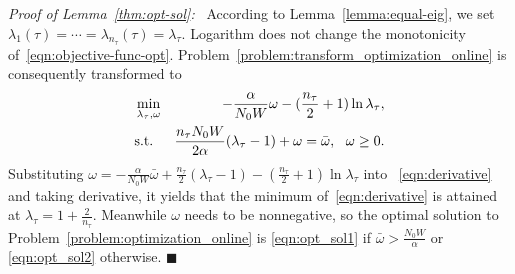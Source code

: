 \documentclass[twocolumn]{autart}    \usepackage{cite}
\begin{document}
{{\textit{Proof of Lemma~\ref{thm:opt-sol}:~}
According to Lemma~\ref{lemma:equal-eig}, we
set $\lambda_1(\tau)=\cdots=\lambda_{n_\tau}(\tau)=
\lambda_\tau$. Logarithm does not change the
monotonicity of~\eqref{eqn:objective-func-opt}.
Problem~\ref{problem:transform_optimization_online}
is consequently transformed to\vspace{-2mm}
\begin{eqnarray}
&\min\limits_{\lambda_\tau,\omega}&-\frac{\alpha}{N_0W}\omega
-(\frac{n_\tau}{2}+1)\ln{\lambda_\tau},\label{eqn:derivative}\\
&\hbox{s.t.}&\frac{n_\tau N_0W}{2\alpha}(\lambda_\tau-1)+\omega=\bar
\omega,~~ \omega\geq 0.\notag
\end{eqnarray}
Substituting $\omega=-\frac{\alpha}{N_0W}\bar \omega
+\frac{n_\tau}{2}(\lambda_\tau-1)-(\frac{n_\tau}{2}
+1)\ln{\lambda_\tau}$ into ~\eqref{eqn:derivative}
and taking derivative, it yields that the minimum
of~\eqref{eqn:derivative} is attained at
$\lambda_\tau=1+\frac{2}{n_\tau}$. Meanwhile
$\omega$ needs to be nonnegative, so
the optimal solution to Problem~\ref{problem:optimization_online} is
\eqref{eqn:opt_sol1} if $\bar\omega>\frac{N_0W}{\alpha}$ or \eqref{eqn:opt_sol2} otherwise.
\hfill $\blacksquare$


}}
\end{document}
